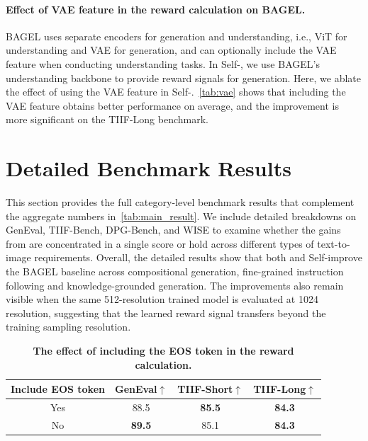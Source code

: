 \paragraph{Effect of VAE feature in the reward calculation on BAGEL.}
\label{sec:ablation_vae}
BAGEL uses separate encoders for generation and understanding, 
i.e., ViT for understanding and VAE for generation, and can optionally include the VAE feature when conducting understanding tasks.
In Self-\method, we use BAGEL's understanding backbone to provide reward signals for generation.
Here, we ablate the effect of using the VAE feature in Self-\method.~\autoref{tab:vae} shows that including the VAE feature obtains better performance on average, 
and the improvement is more significant on the TIIF-Long benchmark.

\section{Detailed Benchmark Results}
\label{app:detailed_benchmark}

This section provides the full category-level benchmark results that complement the aggregate numbers in~\autoref{tab:main_result}. 
We include detailed breakdowns on GenEval, TIIF-Bench, DPG-Bench, and WISE to 
examine whether the gains from \method are concentrated in a single score or hold across different types of text-to-image requirements. 
Overall, the detailed results show that both \method and Self-\method improve the BAGEL baseline across compositional generation, fine-grained instruction following and knowledge-grounded generation. 
The improvements also remain visible when the same 512-resolution trained model is evaluated at 1024 resolution, 
suggesting that the learned reward signal transfers beyond the training sampling resolution.

\begin{table}[t]
    \scriptsize
    \centering
    \caption{\textbf{The effect of including the EOS token in the reward calculation.}
    }
    \label{tab:eos}
    \begin{tabular}{cccc}
    \toprule
    \textbf{Include EOS token} & \textbf{GenEval$\uparrow$} & \textbf{TIIF-Short$\uparrow$} & \textbf{TIIF-Long$\uparrow$} \\
    \midrule
    Yes            & 88.5 & \textbf{85.5} & \textbf{84.3} \\
    \rowcolor{gray!10}
    No           & \textbf{89.5} & 85.1 & \textbf{84.3} \\
    \bottomrule
    \end{tabular}
\end{table}


